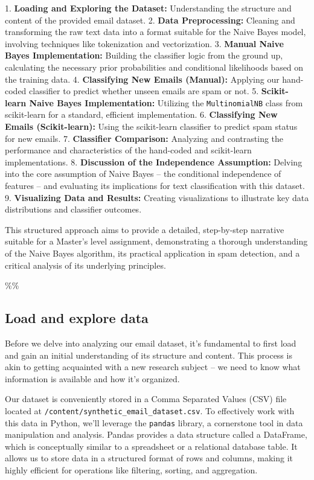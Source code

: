 \documentclass[12pt,a4paper]{article}
\begin{document}
1.  \textbf{Loading and Exploring the Dataset:} Understanding the structure and content of the provided email dataset.
2.  \textbf{Data Preprocessing:} Cleaning and transforming the raw text data into a format suitable for the Naive Bayes model, involving techniques like tokenization and vectorization.
3.  \textbf{Manual Naive Bayes Implementation:} Building the classifier logic from the ground up, calculating the necessary prior probabilities and conditional likelihoods based on the training data.
4.  \textbf{Classifying New Emails (Manual):} Applying our hand-coded classifier to predict whether unseen emails are spam or not.
5.  \textbf{Scikit-learn Naive Bayes Implementation:} Utilizing the \texttt{MultinomialNB} class from scikit-learn for a standard, efficient implementation.
6.  \textbf{Classifying New Emails (Scikit-learn):} Using the scikit-learn classifier to predict spam status for new emails.
7.  \textbf{Classifier Comparison:} Analyzing and contrasting the performance and characteristics of the hand-coded and scikit-learn implementations.
8.  \textbf{Discussion of the Independence Assumption:} Delving into the core assumption of Naive Bayes – the conditional independence of features – and evaluating its implications for text classification with this dataset.
9.  \textbf{Visualizing Data and Results:} Creating visualizations to illustrate key data distributions and classifier outcomes.

This structured approach aims to provide a detailed, step-by-step narrative suitable for a Master's level assignment, demonstrating a thorough understanding of the Naive Bayes algorithm, its practical application in spam detection, and a critical analysis of its underlying principles.

\%\%


\subsection{Load and explore data}

Before we delve into analyzing our email dataset, it's fundamental to first load and gain an initial understanding of its structure and content. This process is akin to getting acquainted with a new research subject – we need to know what information is available and how it's organized.

Our dataset is conveniently stored in a Comma Separated Values (CSV) file located at \texttt{/content/synthetic\_email\_dataset.csv}. To effectively work with this data in Python, we'll leverage the \texttt{pandas} library, a cornerstone tool in data manipulation and analysis. Pandas provides a data structure called a DataFrame, which is conceptually similar to a spreadsheet or a relational database table. It allows us to store data in a structured format of rows and columns, making it highly efficient for operations like filtering, sorting, and aggregation.
\end{document}
